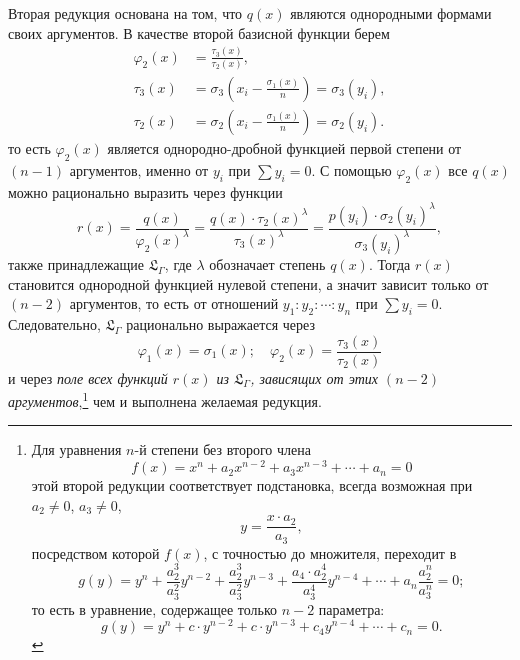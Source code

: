 \documentclass[11pt]{article}
\begin{document}
Вторая редукция основана на том, что $q(x)$ являются однородными формами своих аргументов. В качестве второй базисной функции берем
\[
\begin{aligned}
\varphi_2(x)&=\frac{\tau_3(x)}{\tau_2(x)},\\
\tau_3(x)&=\sigma_3\left(x_i-\frac{\sigma_1(x)}{n}\right)=\sigma_3(y_i),\\
\tau_2(x)&=\sigma_2\left(x_i-\frac{\sigma_1(x)}{n}\right)=\sigma_2(y_i).
\end{aligned}
\]
то есть $\varphi_2(x)$ является однородно-дробной функцией первой степени от $(n-1)$ аргументов, именно от $y_i$ при $\sum y_i=0$. С помощью $\varphi_2(x)$ все $q(x)$ можно рационально выразить через функции
\[
r(x)=\frac{q(x)}{\varphi_2(x)^\lambda}=\frac{q(x)\cdot\tau_2(x)^\lambda}{\tau_3(x)^\lambda}=\frac{p(y_i)\cdot\sigma_2(y_i)^\lambda}{\sigma_3(y_i)^\lambda},
\]
также принадлежащие $\mathfrak L_\Gamma$, где $\lambda$ обозначает степень $q(x)$. Тогда $r(x)$ становится однородной функцией нулевой степени, а значит зависит только от $(n-2)$ аргументов, то есть от отношений $y_1:y_2:\cdots:y_n$ при $\sum y_i=0$. Следовательно, $\mathfrak L_\Gamma$ рационально выражается через
\[
\varphi_1(x)=\sigma_1(x);\quad \varphi_2(x)=\frac{\tau_3(x)}{\tau_2(x)}
\]
и через \emph{поле всех функций $r(x)$ из $\mathfrak L_\Gamma$, зависящих от этих $(n-2)$ аргументов},\footnote{Для уравнения $n$-й степени без второго члена
\[
f(x)=x^n+a_2x^{n-2}+a_3x^{n-3}+\cdots+a_n=0
\]
этой второй редукции соответствует подстановка, всегда возможная при $a_2\neq0$, $a_3\neq0$,
\[
y=\frac{x\cdot a_2}{a_3},
\]
посредством которой $f(x)$, с точностью до множителя, переходит в
\[
g(y)=y^n+\frac{a_2^3}{a_3^2}y^{n-2}+\frac{a_2^3}{a_3^2}y^{n-3}+\frac{a_4\cdot a_2^4}{a_3^4}y^{n-4}+\cdots+a_n\frac{a_2^n}{a_3^n}=0;
\]
то есть в уравнение, содержащее только $n-2$ параметра:
\[
g(y)=y^n+c\cdot y^{n-2}+c\cdot y^{n-3}+c_4y^{n-4}+\cdots+c_n=0.
\]} чем и выполнена желаемая редукция.
\end{document}
